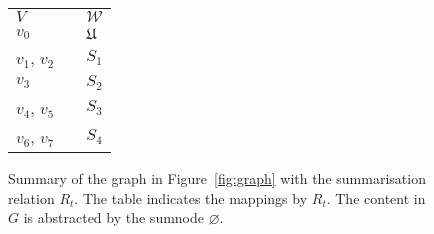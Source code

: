 \begin{figure}
	\centering
	\begin{minipage}{.7\textwidth}
		\resizebox{\textwidth}{!}{
			
		}
	\end{minipage}
	\quad
	\begin{minipage}[h]{.25\textwidth}
		\centering
		\caption*{$R_t\left(V, \mathcal{W}\right)$}
		\begin{tabular}{lc@{\hs}l}
			\toprule
			$V$ & \phantom{a} & $\mathcal{W}$ \\
			\cmidrule{1-1} \cmidrule{3-3}
			$v_0$ & \phantom{a} & $\mathfrak{U}$ \\
			$v_1$, $v_2$ & \phantom{a} & $S_1$ \\
			$v_3$ & \phantom{a} & $S_2$ \\
			$v_4$, $v_5$ & \phantom{a} & $S_3$ \\
			$v_6$, $v_7$ & \phantom{a} & $S_4$ \\
			\bottomrule
		\end{tabular}
	\end{minipage}
	\caption[Types summary of a graph]{Summary of the graph in Figure~\ref{fig:graph} with the summarisation relation $R_t$. The table indicates the mappings by $R_t$. The content in $G$ is abstracted by the sumnode $\varnothing$.}
	\label{fig:classes-summary}
\end{figure}

%

